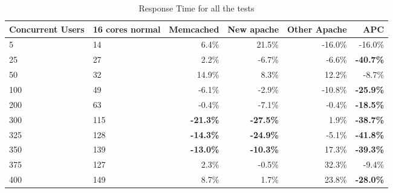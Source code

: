 \begin{table}[htb!]\begin{center}
\caption{Response Time for all the tests}\label{tab:scalingBeginToEndResponseTime}
\begin{tabular}{|p{2.1cm}|p{1.7cm}|r|r|r|r|}\hline\rowcolor{myLightGreen}
 {\bf\color{white} Concurrent Users} & {\bf\color{white} 16 cores normal} & {\bf\color{white} Memcached} & {\bf\color{white} New apache} & {\bf\color{white} Other Apache} & {\bf\color{white} APC} \\ \hline 
 5 & 14 & 6.4\% & 21.5\% & -16.0\% & -16.0\% \\ \hline 
 25 & 27 & 2.2\% & -6.7\% & -6.6\% & \textbf{-40.7\%} \\ \hline 
 50 & 32 & 14.9\% & 8.3\% & 12.2\% & -8.7\% \\ \hline 
 100 & 49 & -6.1\% & -2.9\% & -10.8\% &  \textbf{-25.9\%} \\ \hline 
 200 & 63 & -0.4\% & -7.1\% & -0.4\% &  \textbf{-18.5\%} \\ \hline 
 300 & 115 &  \textbf{-21.3\%} &  \textbf{-27.5\%} & 1.9\% &  \textbf{-38.7\%} \\ \hline 
 325 & 128 &  \textbf{-14.3\%} &  \textbf{-24.9\%} & -5.1\% &  \textbf{-41.8\%} \\ \hline 
 350 & 139 &  \textbf{-13.0\%} &  \textbf{-10.3\%}\textbf{} & 17.3\% &  \textbf{-39.3\%} \\ \hline 
 375 & 127 & 2.3\% & -0.5\% & 32.3\% & -9.4\% \\ \hline 
 400 & 149 & 8.7\% & 1.7\% & 23.8\% &  \textbf{-28.0\%} \\ \hline 
\end{tabular}\end{center}
\end{table}



